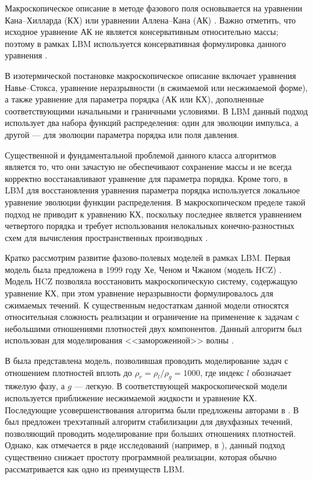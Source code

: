 \documentclass[12pt,a4paper]{article}
\begin{document}
Макроскопическое описание в методе фазового поля основывается на уравнении Кана--Хилларда (КХ) \cite{Cahn1958, Cahn1959} или уравнении Аллена--Кана (АК) \cite{Allen1976}. Важно отметить, что исходное уравнение АК не является консервативным относительно массы; поэтому в рамках LBM используется консервативная формулировка данного уравнения \cite{Chiu2011, Geier2015}.

В изотермической постановке макроскопическое описание включает уравнения Навье--Стокса, уравнение неразрывности (в сжимаемой или несжимаемой форме), а также уравнение для параметра порядка (АК или КХ), дополненные соответствующими начальными и граничными условиями. В LBM данный подход использует два набора функций распределения: один для эволюции импульса, а другой --- для эволюции параметра порядка или поля давления.

Существенной и фундаментальной проблемой данного класса алгоритмов является то, что они зачастую не обеспечивают сохранение массы и не всегда корректно восстанавливают уравнение для параметра порядка. Кроме того, в LBM для восстановления уравнения параметра порядка используется локальное уравнение эволюции функции распределения. В макроскопическом пределе такой подход не приводит к уравнению КХ, поскольку последнее является уравнением четвертого порядка и требует использования нелокальных конечно-разностных схем для вычисления пространственных производных \cite{Wang2019, Li2016}.

Кратко рассмотрим развитие фазово-полевых моделей в рамках LBM. Первая модель была предложена в 1999 году Хе, Ченом и Чжаном (модель HCZ) \cite{He1999-1, He1999-2, Zhang2000}. Модель HCZ позволяла восстановить макроскопическую систему, содержащую уравнение КХ, при этом уравнение неразрывности формулировалось для сжимаемых течений. К существенным недостаткам данной модели относятся относительная сложность реализации и ограничение на применение к задачам с небольшими отношениями плотностей двух компонентов. Данный алгоритм был использован для моделирования <<замороженной>> волны \cite{Volodin2020, Volodin2021}.

В \cite{Inamuro2004} была представлена модель, позволившая проводить моделирование задач с отношением плотностей вплоть до $\rho_{r}=\rho_l / \rho_g=1000$, где индекс $l$ обозначает тяжелую фазу, а $g$ --- легкую. В соответствующей макроскопической модели используется приближение несжимаемой жидкости и уравнение КХ. Последующие усовершенствования алгоритма были предложены авторами в \cite{Inamuro2016, Inamuro2018, Inamuro2021}. В \cite{Lee2005} был предложен трехэтапный алгоритм стабилизации для двухфазных течений, позволяющий проводить моделирование при больших отношениях плотностей. Однако, как отмечается в ряде исследований (например, в \cite{Hu2018}), данный подход существенно снижает простоту программной реализации, которая обычно рассматривается как одно из преимуществ LBM.
\end{document}
